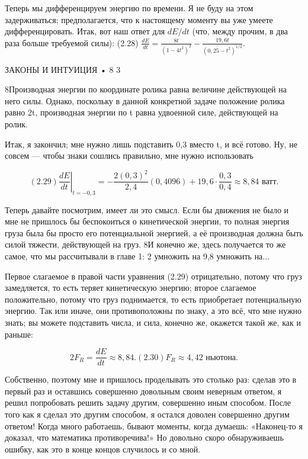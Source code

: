 \documentclass[10pt,oneside]{article}
\begin{document}
Теперь мы дифференцируем энергию по времени. Я не буду на этом задерживаться; предполагается, что к настоящему моменту вы уже умеете дифференцировать. Итак, вот наш ответ для \(dE/dt\) (что, между прочим, в два раза больше требуемой силы): (2.28) \(\frac{dE}{dt} = \frac{8t}{(1 - 4t^2)^2} - \frac{19,6t}{(0,25 - t^2)^{1/2}}\).\par

ЗАКОНЫ И ИНТУИЦИЯ • 8 3\par

8Производная энергии по координате ролика равна величине действующей на него силы. Однако, поскольку в данной конкретной задаче положение ролика равно 2t, производная энергии по t равна удвоенной силе, действующей на ролик.\par

Итак, я закончил; мне нужно лишь подставить 0,3 вместо t, и всё готово. Ну, не совсем --- чтобы знаки сошлись правильно, мне нужно использовать\par

\[(2.29) \left. \frac{dE}{dt} \right|_{t = -0,3} = -\frac{2(0,3)^2}{2,4}(0,4096) + 19,6 \cdot \frac{0,3}{0,4} \approx 8,84\text{ ватт}.\]

Теперь давайте посмотрим, имеет ли это смысл. Если бы движения не было и мне не пришлось бы беспокоиться о кинетической энергии, то полная энергия груза была бы просто его потенциальной энергией, а её производная должна быть силой тяжести, действующей на груз. 8И конечно же, здесь получается то же самое, что мы рассчитывали в главе 1: 2 умножить на 9,8 умножить на...\par

Первое слагаемое в правой части уравнения (2.29) отрицательно, потому что груз замедляется, то есть теряет кинетическую энергию; второе слагаемое положительно, потому что груз поднимается, то есть приобретает потенциальную энергию. Так или иначе, они противоположны по знаку, а это всё, что мне нужно знать; вы можете подставить числа, и сила, конечно же, окажется такой же, как и раньше:\par

\[2F_R = \frac{dE}{dt} \approx 8,84. (2.30) F_R \approx 4,42\text{ ньютона}.\]

Собственно, поэтому мне и пришлось проделывать это столько раз: сделав это в первый раз и оставшись совершенно довольным своим неверным ответом, я решил попробовать решить задачу другим, совершенно иным способом. После того как я сделал это другим способом, я остался доволен совершенно другим ответом! Когда много работаешь, бывают моменты, когда думаешь: «Наконец-то я доказал, что математика противоречива!» Но довольно скоро обнаруживаешь ошибку, как это в конце концов случилось и со мной.\par
\end{document}
